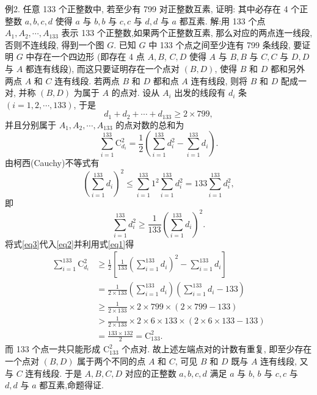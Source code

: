 例2. 任意 133 个正整数中, 若至少有 799 对正整数互素, 证明: 其中必存在 4 个正整数 $a, b, c, d$ 使得 $a$ 与 $b, b$ 与 $c, c$ 与 $d, d$ 与 $a$ 都互素.
解:用 133 个点 $A_1, A_2, \cdots, A_{133}$ 表示 133 个正整数,如果两个正整数互素, 那么对应的两点连一线段, 否则不连线段, 得到一个图 $G$. 已知 $G$ 中 133 个点之间至少连有 799 条线段, 要证明 $G$ 中存在一个四边形 (即存在 4 点 $A, B$, $C, D$ 使得 $A$ 与 $B, B$ 与 $C, C$ 与 $D, D$ 与 $A$ 都连有线段), 而这只要证明存在一个点对 $(B, D)$, 使得 $B$ 和 $D$ 都和另外两点 $A$ 和 $C$ 连有线段.
若两点 $B$ 和 $D$ 都和点 $A$ 连有线段, 则将 $B$ 和 $D$ 配成一对, 并称 $(B, D)$ 为属于 $A$ 的点对.
设从 $A_i$ 出发的线段有 $d_i$ 条 $(i=1,2, \cdots, 133)$, 于是
$$
d_1+d_2+\cdots+d_{133} \geqslant 2 \times 799, \label{eq1}
$$
并且分别属于 $A_1, A_2, \cdots, A_{133}$ 的点对数的总和为
$$
\sum_{i=1}^{133} \mathrm{C}_{d_i}^2=\frac{1}{2}\left(\sum_{i=1}^{133} d_i^2-\sum_{i=1}^{133} d_i\right) . \label{eq2}
$$
由柯西(Cauchy)不等式有
$$
\left(\sum_{i=1}^{133} d_i\right)^2 \leqslant \sum_{i=1}^{133} 1^2 \sum_{i=1}^{133} d_i^2=133 \sum_{i=1}^{133} d_i^2,
$$
即
$$
\sum_{i=1}^{133} d_i^2 \geqslant \frac{1}{133}\left(\sum_{i=1}^{133} d_i\right)^2 . \label{eq3}
$$
将式\ref{eq3}代入\ref{eq2}并利用式\ref{eq1}得
$$
\begin{aligned}
\sum_{i=1}^{133} \mathrm{C}_{d_i}^2 & \geqslant \frac{1}{2}\left[\frac{1}{133}\left(\sum_{i=1}^{133} d_i\right)^2-\sum_{i=1}^{133} d_i\right] \\
& =\frac{1}{2 \times 133}\left(\sum_{i=1}^{133} d_i\right)\left(\sum_{i=1}^{133} d_i-133\right) \\
& \geqslant \frac{1}{2 \times 133} \times 2 \times 799 \times(2 \times 799-133) \\
& >\frac{1}{2 \times 133} \times 2 \times 6 \times 133 \times(2 \times 6 \times 133-133) \\
& =\frac{133 \times 132}{2}=\mathrm{C}_{133}^2 .
\end{aligned}
$$
而 133 个点一共只能形成 $\mathrm{C}_{133}^2$ 个点对.
故上述左端点对的计数有重复, 即至少存在一个点对 $(B, D)$ 属于两个不同的点 $A$ 和 $C$, 可见 $B$ 和 $D$ 既与 $A$ 连有线段, 又与 $C$ 连有线段.
于是 $A, B, C, D$ 对应的正整数 $a, b, c, d$ 满足 $a$ 与 $b$, $b$ 与 $c, c$ 与 $d, d$ 与 $a$ 都互素,命题得证.



